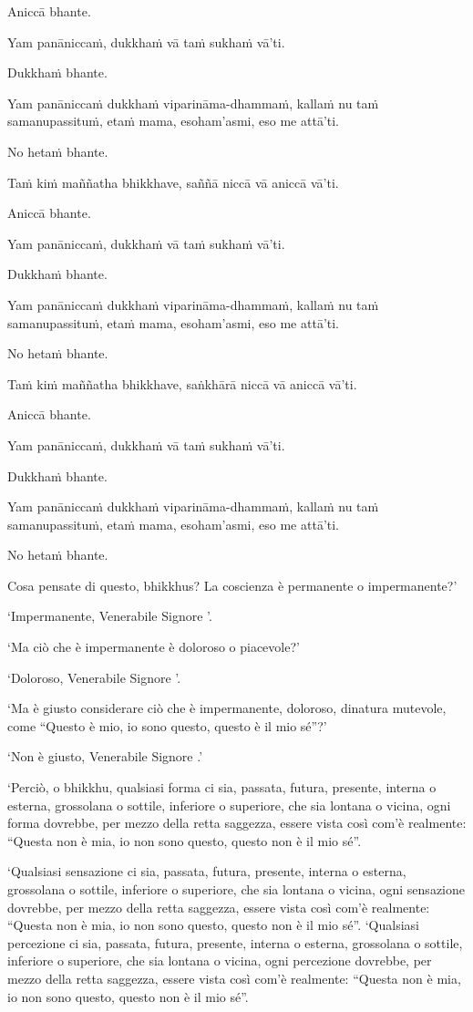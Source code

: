 Aniccā bhante.

Yam panāniccaṁ, dukkhaṁ vā taṁ sukhaṁ vā'ti.

Dukkhaṁ bhante.

Yam panāniccaṁ dukkhaṁ viparināma-dhammaṁ, kallaṁ nu taṁ samanupassituṁ,
etaṁ mama, esoham'asmi, eso me attā'ti.

No hetaṁ bhante.

Taṁ kiṁ maññatha bhikkhave, saññā niccā vā aniccā vā'ti.

Aniccā bhante.

Yam panāniccaṁ, dukkhaṁ vā taṁ sukhaṁ vā'ti.

Dukkhaṁ bhante.

Yam panāniccaṁ dukkhaṁ viparināma-dhammaṁ, kallaṁ nu taṁ samanupassituṁ,
etaṁ mama, esoham'asmi, eso me attā'ti.

No hetaṁ bhante.

Taṁ kiṁ maññatha bhikkhave, saṅkhārā niccā vā aniccā vā'ti.

Aniccā bhante.

Yam panāniccaṁ, dukkhaṁ vā taṁ sukhaṁ vā'ti.

Dukkhaṁ bhante.

Yam panāniccaṁ dukkhaṁ viparināma-dhammaṁ, kallaṁ nu taṁ samanupassituṁ,
etaṁ mama, esoham'asmi, eso me attā'ti.

No hetaṁ bhante.

\clearpage

\englishText
\markboth{\englishTitle}{\rightmark}

Cosa pensate di questo, bhikkhus? La coscienza è permanente o
impermanente?’


‘Impermanente, Venerabile Signore ’.

‘Ma ciò che è impermanente è doloroso o piacevole?’ 

‘Doloroso, Venerabile Signore ’.

‘Ma è giusto considerare ciò che è impermanente, doloroso, dinatura mutevole, come
“Questo è mio, io sono questo, questo è il mio sé”?’

‘Non è giusto, Venerabile Signore .’

‘Perciò, o bhikkhu, qualsiasi forma ci sia, passata, futura, presente,
interna o esterna, grossolana o sottile, inferiore o superiore, che sia
lontana o vicina, ogni forma dovrebbe, per mezzo della retta saggezza, essere vista così com'è
realmente: “Questa non è mia, io non sono questo, questo non è il mio sé”.

‘Qualsiasi sensazione ci sia, passata, futura, presente, interna o
esterna, grossolana o sottile, inferiore o superiore, che sia lontana o
vicina, ogni sensazione dovrebbe, per mezzo della retta saggezza, essere vista così com'è realmente:
“Questa non è mia, io non sono questo, questo non è il mio sé”.
‘Qualsiasi percezione ci sia, passata, futura, presente, interna o
esterna, grossolana o sottile, inferiore o superiore, che sia lontana o
vicina, ogni percezione dovrebbe, per mezzo della retta saggezza, essere vista così com'è realmente:
“Questa non è mia, io non sono questo, questo non è il mio sé”.

